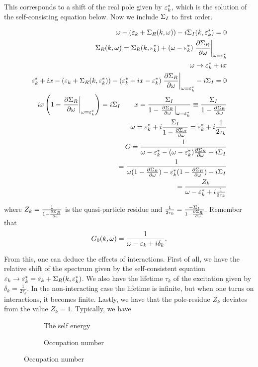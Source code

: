 This corresponds to a shift of the real pole given by $\varepsilon_k^*$, which is the solution of the self-consisting equation below. Now we include $\Sigma_I$ to first order.

\begin{align*}
    \omega - (\ep_k + \s_R(k,\omega)) - i\s_I(k,\ep_k^*) = 0 \\
    \s_R(k, \omega) = \s_R(k, \ep_k^*) + (\omega - \ep_k^*)\eval{\pdv{\s_R}{\omega}}_{\omega = \ep_k^*} \\ 
    \omega \to \ep_k^* + ix \\ 
    \ep_k^* + ix - (\ep_k + \s_R(k,\ep_k^*)) - (\ep_k^* + ix - \ep_k^*)\eval{\pdv{\s_R}{\omega}}_{\omega = \ep_k^*} -i\s_I = 0 \\ 
    ix\left(1 - \eval{\pdv{\s_R}{\omega}}_{\omega = \ep_k^*}\right) = i\s_I \quad \quad 
    x = \frac{\s_I}{1 - \eval{\pdv{\s_R}{\omega}}_{\omega = \ep_k^*}} \equiv \frac{\s_I}{1 - \pdv{\s_R}{\omega}} \\ 
    \omega = \ep_k^* + i \frac{\s_I}{1 - \pdv{\s_R}{\omega}} = \ep_k^* + i\frac{1}{2\tau_k} \\
    G = \frac{1}{\omega - \ep_k^* - (\omega - \ep_k^*)\pdv{\s_R}{\omega} - i\s_I} \\ 
    = \frac{1}{\omega(1- \pdv{\s_R}{\omega}) - \ep_k^*(1 - \pdv{\s_R}{\omega}) - i\s_I} \\ 
    = \frac{Z_k}{\omega - \ep_k^* +i\frac{1}{2\tau_k}}
\end{align*}

where $Z_k = \frac{1}{1 - \pdv{\Sigma_R}{\omega}}$ is the quasi-particle residue and $\frac{1}{2\tau_k} = \frac{-\Sigma_I}{1 - \pdv{\Sigma_R}{\omega}}$. Remember that \\ 

\begin{align*}
    G_0(k, \omega) = \frac{1}{\omega - \varepsilon_k + i \delta_k}. 
\end{align*}

From this, one can deduce the effects of interactions.  First of all, we have the relative shift of the spectrum given by the self-consistent equation $\varepsilon_k \to \varepsilon^*_k = \varepsilon_k + \Sigma_R(k, \varepsilon^*_k)$. We also have the lifetime $\tau_k$ of the excitation given by $\delta_k = \frac{1}{2\tau_k}$. In the non-interacting case the lifetime is infinite, but when one turns on interactions, it becomes finite. Lastly, we have that the pole-residue $Z_k$ deviates from the value $Z_k = 1$. Typically, we have \\ 

\begin{figure}
	\centering
	\begin{subfigure}{0.4\textwidth}    
    
	\caption{The self energy}
	\end{subfigure}
	\hfill
	\begin{subfigure}{0.4\textwidth}
	
	\caption{Occupation number}		
	\end{subfigure}
\end{figure}

